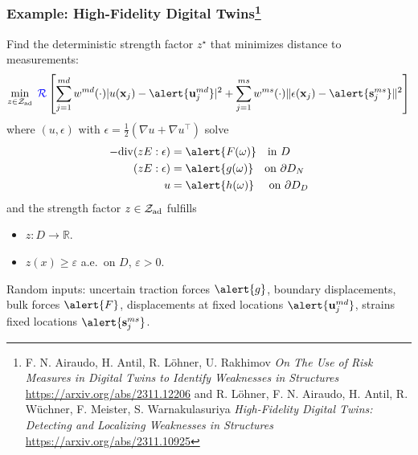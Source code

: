 \documentclass[aspectratio=169,xcolor=dvipsnames,11pt]{beamer}
\newcommand{\Zad}{\mathcal{Z}_{\text{\textup{ad}}}}
\newcommand{\risk}{\mathcal{R}}
\begin{document}
\begin{footnotesize}
\begin{frame}\frametitle{Example: High-Fidelity Digital Twins\footnote{\tiny 
F. N. Airaudo, H. Antil, R. L\"ohner, U. Rakhimov \textit{ On The Use of Risk Measures in Digital Twins to Identify Weaknesses in Structures} \url{https://arxiv.org/abs/2311.12206}\; and 
R. L\"ohner, F. N. Airaudo, H. Antil, R. W\"uchner, F. Meister, S. Warnakulasuriya \textit{High-Fidelity Digital Twins: Detecting and Localizing Weaknesses in Structures} \url{https://arxiv.org/abs/2311.10925}
}}
\vspace{-2ex}
\begin{block}{}
Find the deterministic strength factor $z^{\star}$ that minimizes distance to measurements:
      \[
      \min_{z \in \Zad}\;
         {\color{blue}\risk}\left[
          \sum_{j=1}^{md} w^{md}(\cdot) | u(\mathbf{x}_j) -  \alert{\mathbf{u}^{md}_j}|^2
          + 
           \sum_{j=1}^{ms} w^{ms}(\cdot) \| \epsilon(\mathbf{x}_j) -  \alert{\mathbf{s}^{ms}_j}\|^2\right]
      \]
      where $(u,\epsilon)$ with $ \epsilon  = \tfrac{1}{2}(\nabla u + \nabla u^\top)$
 solve \vspace{-1ex}
      \begin{align*}
        -\mathrm{div}(z E : \epsilon )
            =&\; \alert{F(\omega)} \quad \text{in }D\\
         (z E: \epsilon ) =&\; \alert{g(\omega)} \quad \text{on }\partial D_{N}\\
         u=&\; \alert{h(\omega)} \quad \text{ on } \partial D_{D}
      \end{align*}
and the strength factor $z \in \Zad$ fulfills 
\begin{itemize}
\item $z : D \to \mathbb R$.
\item $z(x) \ge \varepsilon$ a.e.\ on $D$, $\varepsilon > 0$.
\end{itemize}
 
Random inputs:  \alert{uncertain} traction forces $\alert{g}$, boundary displacements, bulk forces $\alert{F}$, displacements at fixed locations $\alert{\mathbf{u}^{md}_j}$,
strains fixed locations $\alert{\mathbf{s}^{ms}_j}$.

\end{block}
\end{frame}


\end{footnotesize}
\end{document}
